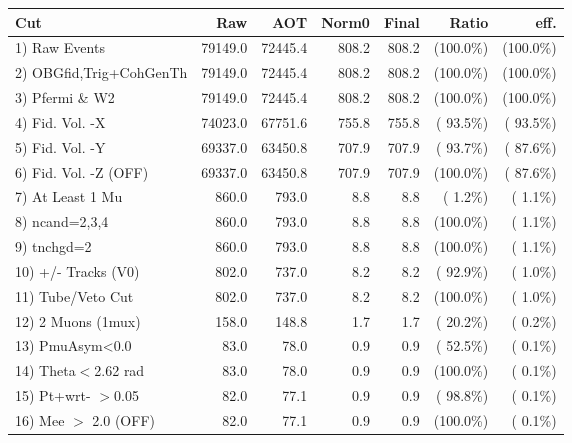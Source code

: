  \begin{table}[h!]\centering
 \begin{tabular}{||l||r|r|r|r|r|r||}
 \hline
 \hline
 Cut & Raw & AOT & Norm0 & Final & Ratio & eff.       \\
 \hline
  1) Raw Events           &      79149.0 &      72445.4 &        808.2 &        808.2 & (100.0\%) & (100.0\%) \\
  2) OBGfid,Trig+CohGenTh &      79149.0 &      72445.4 &        808.2 &        808.2 & (100.0\%) & (100.0\%) \\
  3) Pfermi \& W2         &      79149.0 &      72445.4 &        808.2 &        808.2 & (100.0\%) & (100.0\%) \\
  4) Fid. Vol. -X         &      74023.0 &      67751.6 &        755.8 &        755.8 & ( 93.5\%) & ( 93.5\%) \\
  5) Fid. Vol. -Y         &      69337.0 &      63450.8 &        707.9 &        707.9 & ( 93.7\%) & ( 87.6\%) \\
  6) Fid. Vol. -Z (OFF)   &      69337.0 &      63450.8 &        707.9 &        707.9 & (100.0\%) & ( 87.6\%) \\
  7) At Least 1 Mu        &        860.0 &        793.0 &          8.8 &          8.8 & (  1.2\%) & (  1.1\%) \\
  8) ncand=2,3,4          &        860.0 &        793.0 &          8.8 &          8.8 & (100.0\%) & (  1.1\%) \\
  9) tnchgd=2             &        860.0 &        793.0 &          8.8 &          8.8 & (100.0\%) & (  1.1\%) \\
 10) +/- Tracks (V0)      &        802.0 &        737.0 &          8.2 &          8.2 & ( 92.9\%) & (  1.0\%) \\
 11) Tube/Veto Cut        &        802.0 &        737.0 &          8.2 &          8.2 & (100.0\%) & (  1.0\%) \\
 12) 2 Muons (1mux)       &        158.0 &        148.8 &          1.7 &          1.7 & ( 20.2\%) & (  0.2\%) \\
 13) PmuAsym<0.0          &         83.0 &         78.0 &          0.9 &          0.9 & ( 52.5\%) & (  0.1\%) \\
 14) Theta$<$2.62 rad     &         83.0 &         78.0 &          0.9 &          0.9 & (100.0\%) & (  0.1\%) \\
 15) Pt+wrt- $>$0.05      &         82.0 &         77.1 &          0.9 &          0.9 & ( 98.8\%) & (  0.1\%) \\
 16) Mee $>$ 2.0  (OFF)   &         82.0 &         77.1 &          0.9 &          0.9 & (100.0\%) & (  0.1\%) \\

\end{tabular}
\end{table}
